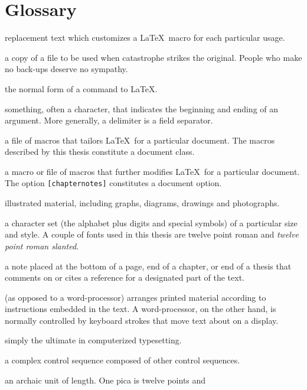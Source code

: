 \documentclass [11pt, proquest] {uwthesis}[2020/02/24]
\begin{document}
%
%
\tableofcontents
\listoffigures
 
%
%
\chapter*{Glossary}      %
\thispagestyle{plain}
%
\begin{glossary}
\item[argument] replacement text which customizes a \LaTeX\ macro for
each particular usage.
\item[back-up] a copy of a file to be used when catastrophe strikes
the original.  People who make no back-ups deserve
no sympathy.
\item[control sequence] the normal form of a command to \LaTeX.
\item[delimiter] something, often a character, that indicates
the beginning and ending of an argument.
More generally, a delimiter is a field separator.
\item[document class] a file of macros that tailors \LaTeX\ for
a particular document.  The macros described by this thesis
constitute a document class.
\item[document option] a macro or file of macros
that further modifies \LaTeX\ for
a particular document.  The option {\tt[chapternotes]}
constitutes a document option.
\item[figure] illustrated material, including graphs,
diagrams, drawings and photographs.
\item[font] a character set (the alphabet plus digits
and special symbols) of a particular size and style.  A couple of fonts
used in this thesis are twelve point roman and {\sl twelve point roman
slanted}.
\item[footnote] a note placed at the bottom of a page, end of a chapter,
or end of a thesis that comments on or cites a reference
for a designated part of the text.
\item[formatter] (as opposed to a word-processor) arranges printed
material according to instructions embedded in the text.
A word-processor, on the other hand, is normally controlled
by keyboard strokes that move text about on a display.
\item[\LaTeX] simply the ultimate in computerized typesetting.
\item[macro]  a complex control sequence composed of 
other control sequences.
\item[pica] an archaic unit of length.  One pica is twelve points and

\end{glossary}
\end{document}
